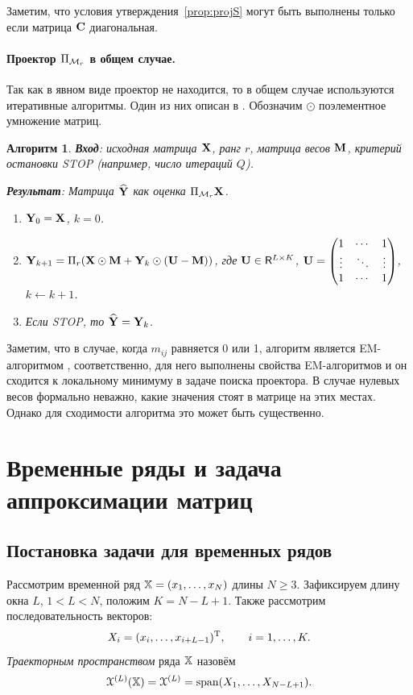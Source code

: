 \documentclass[12pt,a4paper,fleqn,leqno]{article}
\newtheorem{algorithm}{Алгоритм}%
\begin{document}
\begin{remark}
Заметим, что условия утверждения~\ref{prop:projS} могут быть выполнены только если матрица $\mathbf{C}$ диагональная.
\end{remark}

\paragraph{Проектор $\Pi_{\mathcal{M}_r}$ в общем случае.}
Так как в явном виде проектор не находится, то в общем случае используются итеративные алгоритмы.
Один из них описан в \cite{Srebro2003}. Обозначим $\odot$ поэлементное умножение матриц.

\begin{algorithm}
\label{alg:weightedSVD}
\textbf{Вход}: исходная матрица $\mathbf{X}$, ранг $r$, матрица весов $\mathbf{M}$,
критерий остановки STOP (например, число итераций $Q$).

\textbf{Результат}:
Матрица $\widehat{\mathbf{Y}}$ как оценка $\Pi_{\mathcal{M}_r} \mathbf{X}$.

\begin{enumerate}
\item
$\mathbf{Y}_0 = \mathbf{X}$, $k=0$.
\item
$\mathbf{Y}_{k+1} = \Pi_r(\mathbf{X} \odot \mathbf{M} + \mathbf{Y}_{k} \odot (\mathbf{U} -  \mathbf{M}))$, где
$\mathbf{U} \in \mathsf{R}^{L \times K}$,  $\mathbf{U} = \begin{pmatrix}
1 & \cdots & 1 \\
\vdots & \ddots & \vdots \\
1 & \cdots & 1
\end{pmatrix}$, $k\leftarrow k+1$.
\item
Если STOP, то $\widehat{\mathbf{Y}} = \mathbf{Y}_k$.
\end{enumerate}
\end{algorithm}

Заметим, что в случае, когда $m_{ij}$ равняется 0 или 1, алгоритм является EM-алгоритмом \cite{Srebro2003},
соответственно, для него выполнены свойства EM-алгоритмов и он сходится к локальному минимуму в задаче поиска проектора.
В случае нулевых весов формально неважно, какие значения стоят в матрице на этих местах. Однако для сходимости алгоритма
это может быть существенно.

\section{Временные ряды и задача аппроксимации матриц}
\label{sec:ts_matrices}
\subsection{Постановка задачи для временных рядов}
Рассмотрим временной ряд $\mathbb{X} = (x_1, \ldots, x_N)$ длины $N \ge 3$. Зафиксируем длину окна $L$, $1 < L < N$, положим $K = N - L + 1$. Также рассмотрим последовательность векторов:
\begin{equation}\label{l_lagged}
X_i = (x_i, \ldots, x_{i + L - 1})^{\mathrm{T}}, \qquad i = 1, \ldots, K.
\end{equation}
\emph{Траекторным пространством} ряда $\mathbb{X}$ назовём $$\EuScript{X}^{(L)}(\mathbb{X}) = \EuScript{X}^{(L)} = \text{span}(X_1, \ldots, X_{N-L+1}).$$
\end{document}
